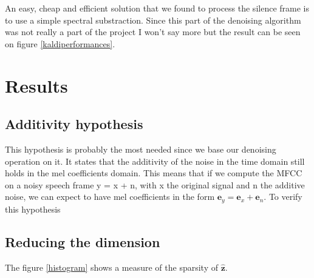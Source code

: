 \documentclass[a4paper]{report}
\newcommand{\ey}{\textbf{e}_y}
\newcommand{\ex}{\textbf{e}_x}
\newcommand{\en}{\textbf{e}_n}
\newcommand{\zhat}{ \hat{\textbf{z}} }
\begin{document}
An  easy, cheap and efficient solution that we found to process the silence frame is to use a simple spectral substraction.
Since this part of the denoising algorithm was not really a part of the project I won't say more but the result can be seen on figure \ref{kaldiperformances}.



\pagebreak
\section{Results}
\subsection{Additivity hypothesis}
This hypothesis is probably the most needed since we base our denoising operation on it. It states that the additivity of the noise in the time domain still holds in the mel coefficients domain.
This means that if we compute the MFCC on a noisy speech frame y = x + n, with x the original signal and n the additive noise, we can expect to have mel coefficients in the form $\ey= \ex + \en$.
To verify this hypothesis 

\subsection{Reducing the dimension}
The figure \ref{histogram} shows a measure of the sparsity of $\zhat$.
\end{document}
